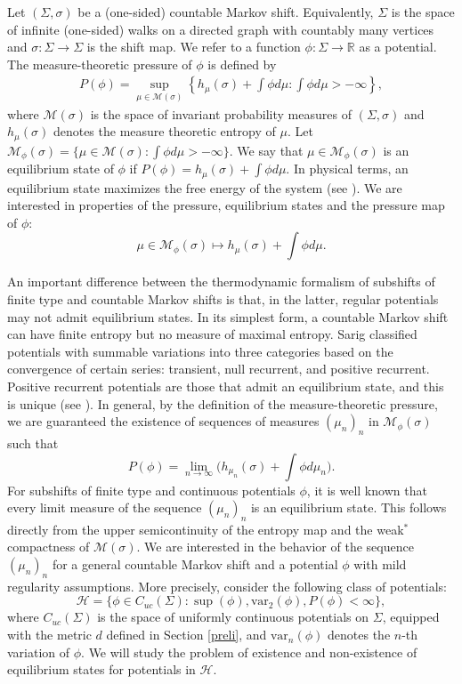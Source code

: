 \documentclass[letterpaper,11pt]{amsart}
\theoremstyle{plain}
\theoremstyle{plain}
\theoremstyle{definition}
\theoremstyle{remark}
\def\R{{\mathbb R}}
\def\M{{\mathcal M}}
\def\H{{\mathcal H}}
\begin{document}
Let $(\Sigma,\sigma)$ be a (one-sided) countable Markov shift. Equivalently, $\Sigma$ is the space of infinite (one-sided) walks on a directed graph with countably many vertices and $\sigma:\Sigma\to\Sigma$  is the shift map. We refer to a function $\phi:\Sigma\to\R$ as a potential. The measure-theoretic pressure of $\phi$ is defined by 
\begin{align*} P(\phi)=\sup_{\mu\in \M(\sigma)}\left\{h_\mu(\sigma)+\int \phi d\mu:\int\phi d\mu>-\infty\right\},\end{align*}
where $\M(\sigma)$ is the space of invariant probability measures of $(\Sigma,\sigma)$ and $h_\mu(\sigma)$ denotes the measure theoretic entropy of $\mu$.  Let $\M_{\phi}(\sigma)=\{\mu\in\M(\sigma):\int \phi d\mu>-\infty\}$. We say that $\mu\in \M_\phi(\sigma)$ is an equilibrium state of $\phi$ if $P(\phi)=h_{\mu}(\sigma)+\int \phi d\mu$. In physical terms, an equilibrium state maximizes the free energy of the system (see \cite{ruelle}). We are interested in properties of the pressure, equilibrium states and the pressure map of $\phi$: $$\mu\in \M_{\phi}(\sigma)\mapsto h_{\mu}(\sigma)+\int \phi d\mu.$$

An important difference between the thermodynamic formalism of subshifts of finite type and countable Markov shifts is that, in the latter, regular potentials may not admit equilibrium states. In its simplest form, a countable Markov shift can have finite entropy but no measure of maximal entropy. Sarig \cite{sa1} classified potentials with summable variations into three categories based on the convergence of certain series: transient, null recurrent, and positive recurrent. Positive recurrent potentials are those that admit an equilibrium state, and this is unique (see \cite{bs}). In general, by the definition of the measure-theoretic pressure, we are guaranteed the existence of sequences of measures  $(\mu_n)_n$ in $\M_\phi(\sigma)$ such that $$P(\phi)=\lim_{n\to\infty}\bigg( h_{\mu_n}(\sigma)+\int \phi d\mu_n\bigg).$$
For subshifts of finite type and continuous potentials $\phi$, it is well known that every limit measure of the sequence $(\mu_n)_n$  is an equilibrium state. This follows directly from the upper semicontinuity of the entropy map and the weak$^*$ compactness of $\M(\sigma)$. We are interested in the behavior of the sequence $(\mu_n)_n$ for a general countable Markov shift and a potential $\phi$ with mild regularity assumptions. More precisely, consider the following class of potentials:
$$\label{H}\H=\{\phi\in C_{uc}(\Sigma): \sup(\phi), \text{var}_2(\phi),P(\phi)<\infty\},$$
where $C_{uc}(\Sigma)$ is the space of uniformly continuous potentials on $\Sigma$, equipped with the metric $d$ defined in Section \ref{preli}, and $\text{var}_n(\phi)$ denotes the $n$-th variation of $\phi$. We will study the problem of existence and non-existence of equilibrium states for potentials in $\H$.
\end{document}
